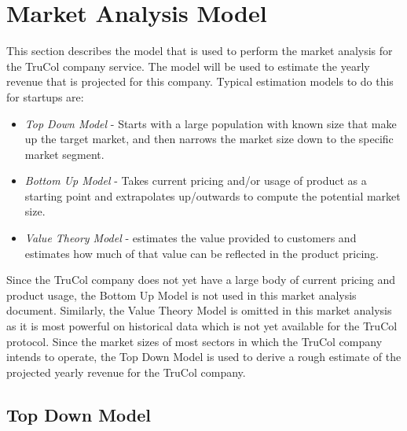 \section{Market Analysis Model}\label{sec:market_analysis_model}
This section describes the model that is used to perform the market analysis for the TruCol company service. The model will be used to estimate the yearly revenue that is projected for this company. Typical estimation models to do this for startups are:
\begin{itemize}
	\item \textit{Top Down Model} - Starts with a large population with known size that make up the target market, and then narrows the market size down to the specific market segment.
	\item \textit{Bottom Up Model} - Takes current pricing and/or usage of product as a starting point and extrapolates up/outwards to compute the potential market size.
	\item \textit{Value Theory Model} - estimates the value provided to customers and estimates how much of that value can be reflected in the product pricing.
\end{itemize}

\noindent Since the TruCol company does not yet have a large body of current pricing and product usage, the Bottom Up Model is not used in this market analysis document. Similarly, the Value Theory Model is omitted in this market analysis as it is most powerful on historical data which is not yet available for the TruCol protocol. Since the market sizes of most sectors in which the TruCol company intends to operate, the Top Down Model is used to derive a rough estimate of the projected yearly revenue for the TruCol company.

\subsection{Top Down Model}\label{subsec:results_top_down}